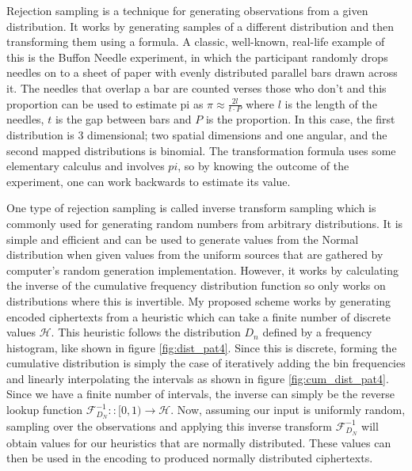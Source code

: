 \documentclass[ %
                    author={Samuel Russell},
                supervisor={Prof. Bogdan Warinschi},
                    degree={MEng},
                     title={Innocuous Ciphertexts},
                  subtitle={The DE-CENSOR Scheme},
                      type={research},
                      year={2018} ]{dissertation}
\begin{document}
Rejection sampling is a technique for generating observations from a given distribution. It works by generating samples of a different distribution and then transforming them using a formula.
A classic, well-known, real-life example of this is the Buffon Needle experiment, in which the participant randomly drops needles on to a sheet of paper with evenly distributed parallel bars drawn across it.
The needles that overlap a bar are counted verses those who don't and this proportion can be used to estimate pi as $\pi \approx \frac{2l}{t \cdot P}$ where $l$ is the length of the needles, $t$ is the gap between bars and $P$ is the proportion.
In this case, the first distribution is 3 dimensional; two spatial dimensions and one angular, and the second mapped distributions is binomial.
The transformation formula uses some elementary calculus and involves $pi$, so by knowing the outcome of the experiment, one can work backwards to estimate its value.

One type of rejection sampling is called inverse transform sampling which is commonly used for generating random numbers from arbitrary distributions.
It is simple and efficient and can be used to generate values from the Normal distribution when given values from the uniform sources that are gathered by computer's random generation implementation.
However, it works by calculating the inverse of the cumulative frequency distribution function so only works on distributions where this is invertible.
My proposed scheme works by generating encoded ciphertexts from a heuristic which can take a finite number of discrete values $\mathcal{H}$.
This heuristic follows the distribution $D_n$ defined by a frequency histogram, like shown in figure \ref{fig:dist_pat4}.
Since this is discrete, forming the cumulative distribution is simply the case of iteratively adding the bin frequencies and linearly interpolating the intervals as shown in figure \ref{fig:cum_dist_pat4}.
Since we have a finite number of intervals, the inverse can simply be the reverse lookup function $\mathcal{F}^{-1}_{D_N} :: [0,1) \rightarrow \mathcal{H}$.
Now, assuming our input is uniformly random, sampling over the observations and applying this inverse transform $\mathcal{F}^{-1}_{D_N}$ will obtain values for our heuristics that are normally distributed.
These values can then be used in the encoding to produced normally distributed ciphertexts.
\end{document}
